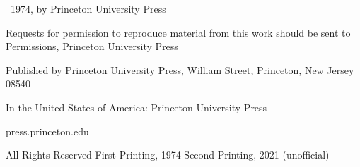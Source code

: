 \begin{copyrightpage}
\textcopyright\ 1974, by Princeton University Press

\vspace*{5pt}

Requests for permission to reproduce material from this\newline
work should be sent to Permissions, Princeton University Press

\vspace*{5pt}

Published by Princeton University Press, William Street, Princeton, New Jersey 08540

\vspace*{5pt}

In the United States of America: Princeton University Press

\vspace*{5pt}

{press.princeton.edu}

\vspace*{5pt}

All Rights Reserved\newline
First Printing, 1974\newline
Second Printing, 2021 (unofficial)

%


%



\end{copyrightpage}
